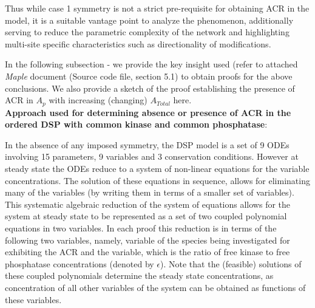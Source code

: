\documentclass[9pt,lineno]{elife}
\begin{document}
\begin{appendixbox}
Thus while case 1 symmetry is not a strict pre-requisite for obtaining ACR in the model, it is a suitable vantage point to analyze the phenomenon, additionally serving to reduce the parametric complexity of the network and highlighting multi-site specific characteristics such as directionality of modifications.

In the following subsection - we provide the key insight used (refer to attached \textit{Maple} document (Source code file, section 5.1) to obtain proofs for the above conclusions. We also provide a sketch of the proof establishing the presence of ACR in $A_p$ with increasing (changing) $A_{Total}$ here. \\

\noindent \textbf{Approach used for determining absence or presence of ACR in the ordered DSP with common kinase and common phosphatase}: 

In the absence of any imposed symmetry, the  DSP model is a set of 9 ODEs involving 15 parameters, 9 variables and 3 conservation conditions. However at steady state the ODEs reduce to a  system of non-linear equations for the variable concentrations. The solution of these equations in sequence, allows for eliminating many of the variables (by writing them in terms of a smaller set of variables).
This systematic algebraic reduction of the system of equations allows for the system at steady state to be represented as a set of two coupled polynomial equations in two variables. In each proof this reduction is in terms of the following two variables, namely, variable of the species being investigated for exhibiting the ACR and the variable, which is the ratio of free kinase to free phosphatase concentrations (denoted by $\epsilon$). Note that the (feasible) solutions of these coupled polynomials determine the steady state concentrations, as concentration of all other variables of the system can be obtained as functions of these variables. 



\end{appendixbox}
\end{document}

